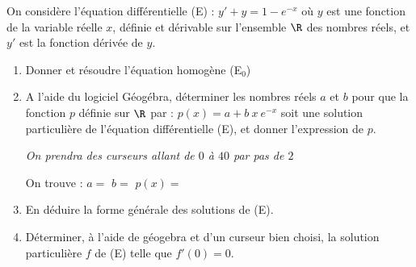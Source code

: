 On considère l’équation différentielle (E) : $y' + y = 1-e^{-x}$ où $y$ est une fonction de la variable réelle $x$, définie et dérivable sur l’ensemble $\R$ des nombres réels, et $y'$ est la fonction dérivée de $y$.

\begin{enumerate}
	\item Donner et résoudre l'équation homogène (E$_0$)\sautp

	\item A l’aide du logiciel Géogébra, déterminer les nombres réels $a$ et $b$ pour que la fonction $p$ définie sur $\R$ par : $p(x) = a + b~x~e^{-x}$ soit une solution particulière de l'équation différentielle (E), et donner l’expression de $p$. 
		
		{\it On prendra des curseurs allant de $0$ à $40$ par pas de $2$}\sautm
		
		On trouve : $a=$\makebox[0.1\linewidth]{\dotfill} \hfill $b=$\makebox[0.1\linewidth]{\dotfill} \hfill $p(x)=$\makebox[0.3\linewidth]{\dotfill}\sauts
		
		\appelprof
	
	\item En déduire la forme générale des solutions de (E).\sautp

	\item Déterminer, à l'aide de géogebra et d'un curseur bien choisi, la solution particulière $f$ de (E) telle que $f'(0)=0$.\sautp

	
	\appelprof
\end{enumerate}